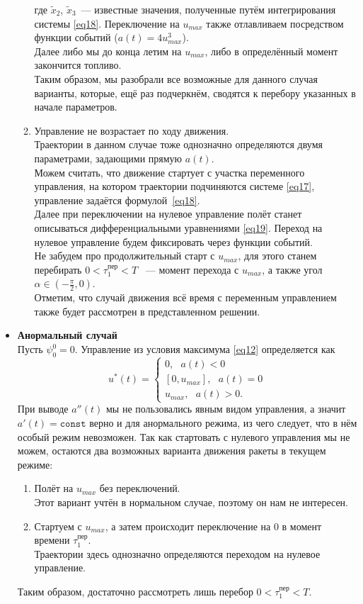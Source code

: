 \documentclass[a4paper,12pt]{article}
\begin{document}
\begin{itemize}
\begin{enumerate}
где $\tilde{x}_2$, $\tilde{x}_3$~--- известные значения, полученные путём интегрирования системы \eqref{eq18}. Переключение на $u_{max}$ также отлавливаем посредством функции событий ($a(t) = 4u^3_{max}$). \\
Далее либо мы до конца летим на $u_{max}$, либо в определённый момент закончится топливо. \\
Таким образом, мы разобрали все возможные для данного случая варианты, которые, ещё раз подчеркнём, сводятся к перебору указанных в начале параметров.

\item Управление не возрастает по ходу движения. \\
Траектории в данном случае тоже однозначно определяются двумя параметрами, задающими прямую $a(t)$. \\
Можем считать, что движение стартует с участка переменного управления, на котором траектории подчиняются системе \eqref{eq17}, управление задаётся формулой~\eqref{eq18}. \\
Далее при переключении на нулевое управление полёт станет описываться дифференциальными уравнениями \eqref{eq19}. Переход на нулевое управление будем фиксировать через функции событий. \\
Не забудем про продолжительный старт с $u_{max}$, для этого станем перебирать $0 < \tau_1^{\text{пер}} < T$ ~--- момент перехода с $u_{max}$, а также угол $\alpha \in (-\frac{\pi}{2}, 0)$. \\
Отметим, что случай движения всё время с переменным управлением также будет рассмотрен в представленном решении.
\end{enumerate}

\item \textbf{Анормальный случай} \\
Пусть $\psi_0^0 = 0$. Управление из условия максимума \eqref{eq12} определяется как
$$u^*(t) = \begin{cases}
	0, \ \ \ a(t) < 0 \\
	[0, u_{max}], \ \ \ a(t) = 0 \\
	u_{max}, \ \ \ a(t) > 0.
\end{cases}$$
При выводе $a''(t)$ мы не пользовались явным видом управления, а значит $a'(t) = \texttt{const}$ верно и для анормального режима, из чего следует, что в нём особый режим невозможен. Так как стартовать с нулевого управления мы не можем, остаются два возможных варианта движения ракеты в текущем режиме:
\begin{enumerate}
\item Полёт на $u_{max}$ без переключений. \\
Этот вариант учтён в нормальном случае, поэтому он нам не интересен.
\item Стартуем с $u_{max}$, а затем происходит переключение на 0 в момент времени $\tau_1^{\text{пер}}$. \\
Траектории здесь однозначно определяются переходом на нулевое управление. 
\end{enumerate}
Таким образом, достаточно рассмотреть лишь перебор $0 < \tau_1^{\text{пер}} < T$.


\end{itemize}
\end{document}
